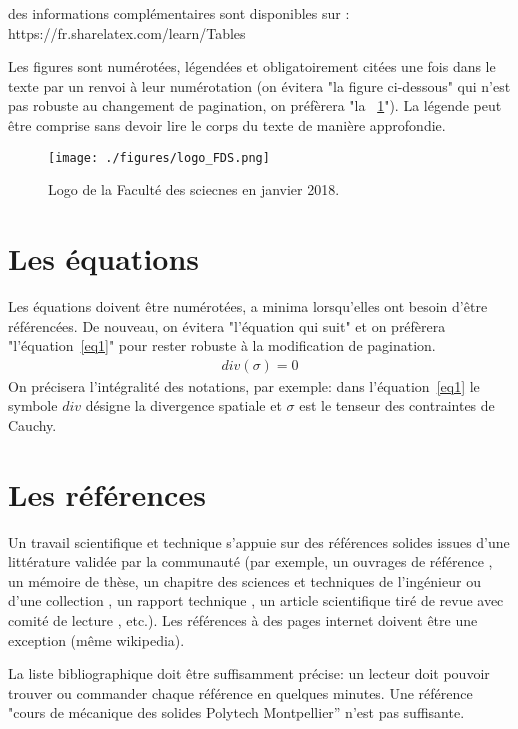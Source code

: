 \documentclass[a4paper,11pt]{paper}
\begin{document}
des informations complémentaires sont disponibles sur : https://fr.sharelatex.com/learn/Tables

Les figures sont numérotées, légendées et obligatoirement citées une fois dans le texte par un renvoi à leur numérotation (on évitera "la figure ci-dessous" qui n'est pas robuste au changement de pagination, on préfèrera "la \figurename~\ref{fig:logo}"). La légende peut être comprise sans devoir lire le corps du texte de manière approfondie.

\begin{figure}[h]
\centering
\texttt{[image: ./figures/logo\_FDS.png]}
\caption{Logo de la Faculté des sciecnes en janvier 2018.}
\label{fig:logo}
\end{figure}
 
\section{Les équations}

Les équations doivent être numérotées, a minima lorsqu'elles ont besoin d'être référencées. De nouveau, on évitera "l'équation qui suit" et on préfèrera "l'équation~\eqref{eq1}" pour rester robuste à la modification de pagination.
\begin{eqnarray}
div(\sigma)=0
\label{eq1}
\end{eqnarray}
On précisera l'intégralité des notations, par exemple: dans l'équation~\eqref{eq1} le symbole $div$ désigne la divergence spatiale et $\sigma$ est le tenseur des contraintes de Cauchy.

\section{Les références}

Un travail scientifique et technique s'appuie sur des références solides issues d'une littérature validée par la communauté (par exemple, un ouvrages de référence \cite{maxwell_1873}, un mémoire de thèse, un chapitre des sciences et techniques de l'ingénieur ou d'une collection \cite{Moreau1988}, un rapport technique \cite{Karb_et_al_KFK_1983}, un article scientifique tiré de revue avec comité de lecture \cite{grange_et_al_IJF_2000}, etc.). Les références à des pages internet doivent être une exception (même wikipedia).  

La liste bibliographique doit être suffisamment précise: un lecteur doit pouvoir trouver ou commander chaque référence en quelques minutes. Une référence "cours de mécanique des solides Polytech Montpellier” n'est pas suffisante.
\end{document}
